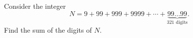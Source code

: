 Consider the integer \[N=9+99+999+9999+\cdots+\underbrace{99\ldots99}_{321\text{ digits}}.\] Find the sum of the digits of $N$.